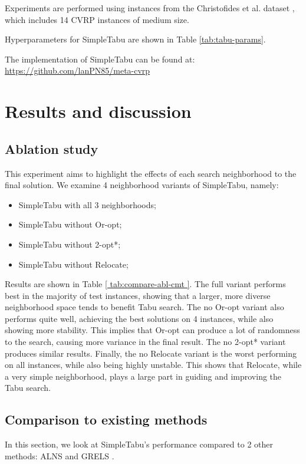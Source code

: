 \documentclass[12pt]{report}
\begin{document}
Experiments are performed using instances from the Christofides et al. dataset \cite{christofides1976vehicle}, which includes 14 CVRP instances of medium size.

Hyperparameters for SimpleTabu are shown in Table \ref{tab:tabu-params}.

The implementation of SimpleTabu can be found at: \href{https://github.com/lanPN85/meta-cvrp}{https://github.com/lanPN85/meta-cvrp}


\FloatBarrier

\section{Results and discussion}
\subsection{Ablation study}
This experiment aims to highlight the effects of each search neighborhood to the final solution. We examine 4 neighborhood variants of SimpleTabu, namely:
\begin{itemize}
	\item SimpleTabu with all 3 neighborhoods;
	\item SimpleTabu without Or-opt;
	\item SimpleTabu without 2-opt*;
	\item SimpleTabu without Relocate;
\end{itemize}

Results are shown in Table \ref{ tab:compare-abl-cmt }. The full variant performs best in the majority of test instances, showing that a larger, more diverse neighborhood space tends to benefit Tabu search. The no Or-opt variant also performs quite well, achieving the best solutions on 4 instances, while also showing more stability. This implies that Or-opt can produce a lot of randomness to the search, causing more variance in the final result. The no 2-opt* variant produces similar results. Finally, the no Relocate variant is the worst performing on all instances, while also being highly unstable. This shows that Relocate, while a very simple neighborhood, plays a large part in guiding and improving the Tabu search.



\subsection{Comparison to existing methods}
In this section, we look at SimpleTabu's performance compared to 2 other methods: ALNS \cite{pisinger2007general} and GRELS \cite{prins2009grasp}.
\end{document}
